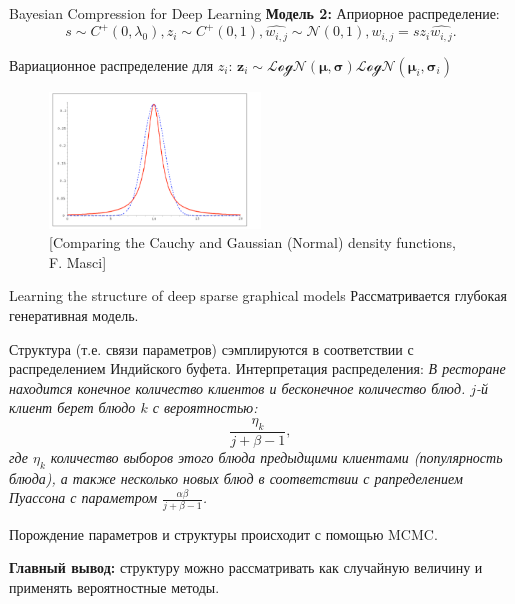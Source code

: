 \documentclass[10pt,pdf,utf8,russian,aspectratio=169]{beamer}
\begin{document}
\begin{frame}{Bayesian Compression for Deep Learning}
\textbf{Модель 2:}
Априорное распределение:
\[
   s \sim C^{+} (0, \lambda_0), z_i  \sim C^{+} (0, 1), \hat{w_{i,j}} \sim \mathcal{N}(0,1),  w_{i,j} =  s  z_i \hat{w_{i,j}}.
\]

Вариационное распределение для $z_i$: 
$
    \mathbf{z}_i \sim  \mathcal{LogN} (\boldsymbol{\mu}, \boldsymbol{\sigma}) \mathcal{LogN} (\boldsymbol{\mu}_i, \boldsymbol{\sigma}_i)
$ 


\begin{figure}
\includegraphics[width=0.5\textwidth]{cauchy.png}
\caption*{[Comparing the Cauchy and Gaussian (Normal) density functions, F. Masci]}
\end{figure}
\end{frame}


\begin{frame}{Learning the structure of deep sparse graphical models}
Рассматривается глубокая генеративная модель.

Структура (т.е. связи параметров) сэмплируются в соответствии с распределением Индийского буфета. Интерпретация распределения:
\textit{В ресторане находится конечное количество клиентов и бесконечное количество блюд. $j$-й клиент берет блюдо $k$ с вероятностью:
\[
    \frac{\eta_k}{j+\beta-1},
\]
где $\eta_k$ количество выборов этого блюда предыдщими клиентами (популярность блюда), а также несколько новых блюд в соответствии с рапределением Пуассона с параметром $\frac{\alpha \beta }{j+\beta - 1}$.}

Порождение параметров и структуры происходит с помощью MCMC.


\textbf{Главный вывод:} структуру можно рассматривать как случайную величину и применять вероятностные методы.

\end{frame}
\end{document}
